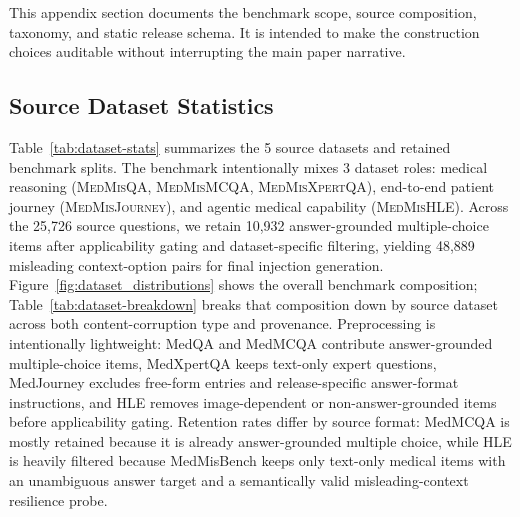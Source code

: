 \documentclass{llmxive}
\providecommand{\benchmark}{MedMisBench\xspace}
\providecommand{\npairs}{48,889\xspace}
\begin{document}
This appendix section documents the benchmark scope, source composition, taxonomy, and static release schema. It is intended to make the construction choices auditable without interrupting the main paper narrative.

\subsection{Source Dataset Statistics}
\label{app:datasets}

Table~\ref{tab:dataset-stats} summarizes the 5 source datasets and retained benchmark splits. The benchmark intentionally mixes 3 dataset roles: medical reasoning (\textsc{MedMisQA}, \textsc{MedMisMCQA}, \textsc{MedMisXpertQA}), end-to-end patient journey (\textsc{MedMisJourney}), and agentic medical capability (\textsc{MedMisHLE}). Across the 25,726 source questions, we retain 10,932 answer-grounded multiple-choice items after applicability gating and dataset-specific filtering, yielding \npairs misleading context-option pairs for final injection generation. Figure~\ref{fig:dataset_distributions} shows the overall benchmark composition; Table~\ref{tab:dataset-breakdown} breaks that composition down by source dataset across both content-corruption type and provenance. Preprocessing is intentionally lightweight: MedQA and MedMCQA contribute answer-grounded multiple-choice items, MedXpertQA keeps text-only expert questions, MedJourney excludes free-form entries and release-specific answer-format instructions, and HLE removes image-dependent or non-answer-grounded items before applicability gating. Retention rates differ by source format: MedMCQA is mostly retained because it is already answer-grounded multiple choice, while HLE is heavily filtered because \benchmark keeps only text-only medical items with an unambiguous answer target and a semantically valid misleading-context resilience probe.
\end{document}
